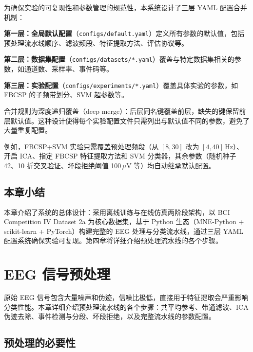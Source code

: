 为确保实验的可复现性和参数管理的规范性，本系统设计了三层 YAML 配置合并机制：

\textbf{第一层：全局默认配置}（\texttt{configs/default.yaml}）定义所有参数的默认值，包括预处理流水线顺序、滤波频段、特征提取方法、评估协议等。

\textbf{第二层：数据集配置}（\texttt{configs/datasets/*.yaml}）覆盖与特定数据集相关的参数，如通道数、采样率、事件码等。

\textbf{第三层：实验配置}（\texttt{configs/experiments/*.yaml}）覆盖具体实验的参数，如 FBCSP 的子频带划分、SVM 超参数等。

合并规则为深度递归覆盖（deep merge）：后层同名键覆盖前层，缺失的键保留前层默认值。这种设计使得每个实验配置文件只需列出与默认值不同的参数，避免了大量重复配置。

例如，FBCSP+SVM 实验只需覆盖预处理频段（从 $[8, 30]$ 改为 $[4, 40]$\,Hz）、开启 ICA、指定 FBCSP 特征提取方法和 SVM 分类器，其余参数（随机种子 42、10 折交叉验证、坏段拒绝阈值 100\,$\mu$V 等）均自动继承默认配置。

\subsection{本章小结}

本章介绍了系统的总体设计：采用离线训练与在线仿真两阶段架构，以 BCI Competition IV Dataset 2a 为核心数据集，基于 Python 生态（MNE-Python + scikit-learn + PyTorch）构建完整的 EEG 处理与分类流水线，通过三层 YAML 配置系统确保实验可复现。第四章将详细介绍预处理流水线的各个步骤。


\section{EEG 信号预处理}
\label{sec:preprocessing}

原始 EEG 信号包含大量噪声和伪迹，信噪比极低，直接用于特征提取会严重影响分类性能。本章详细介绍预处理流水线的各个步骤：共平均参考、带通滤波、ICA 伪迹去除、事件检测与分段、坏段拒绝，以及完整流水线的参数配置。

\subsection{预处理的必要性}


